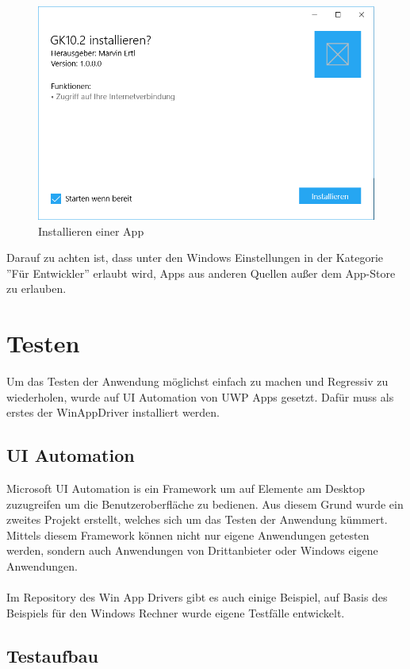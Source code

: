 \begin{figure}[H]
	\centering
	\includegraphics[width=0.7\linewidth]{images/screenshot007}
	\caption{Installieren einer App}
	\label{fig:screenshot007}
\end{figure}

Darauf zu achten ist, dass unter den Windows Einstellungen in der Kategorie ''Für Entwickler'' erlaubt wird, Apps aus anderen Quellen außer dem App-Store zu erlauben.

\section{Testen}

Um das Testen der Anwendung möglichst einfach zu machen und Regressiv zu wiederholen, wurde auf UI Automation von UWP Apps gesetzt. Dafür muss als erstes der WinAppDriver installiert werden. \cite{WinAppDriver}

\subsection{UI Automation}

Microsoft UI Automation is ein Framework um auf Elemente am Desktop zuzugreifen um die Benutzeroberfläche zu bedienen. Aus diesem Grund wurde ein zweites Projekt erstellt, welches sich um das Testen der Anwendung kümmert. Mittels diesem Framework können nicht nur eigene Anwendungen getesten werden, sondern auch Anwendungen von Drittanbieter oder Windows eigene Anwendungen. \cite{uiautooverview}
\\\\
Im Repository des Win App Drivers gibt es auch einige Beispiel, auf Basis des Beispiels für den Windows Rechner wurde eigene Testfälle entwickelt.

\subsection{Testaufbau}

